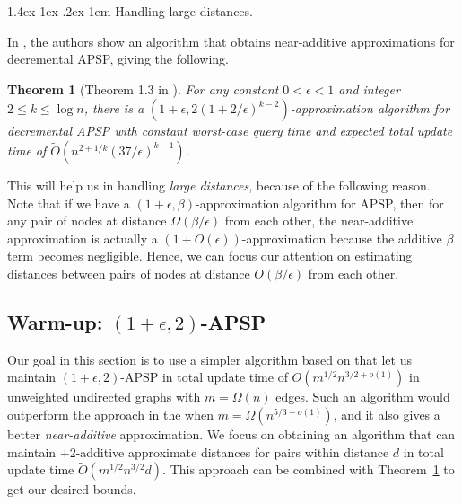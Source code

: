 \documentclass[11pt]{article}
\makeatletter
\newtheorem{theorem}{Theorem}[section]
\theoremstyle{definition}
\theoremstyle{remark}
\newcommand{\remove}[1]{}
\renewcommand{\paragraph}{%
  \@startsection{paragraph}{4}%
  {\z@}{1.4ex \@plus 1ex \@minus .2ex}{-1em}%
  {\normalfont\normalsize\bfseries}%
}
\makeatother
\begin{document}
\begin{titlepage}
\paragraph{Handling large distances.} 

In \cite{HKN14}, the authors show an algorithm that obtains near-additive approximations for decremental APSP, giving the following.

\begin{theorem}[Theorem 1.3 in \cite{HKN14}]\label{thm_large}
For any constant $0 < \epsilon < 1$ and integer $2 \leq k \leq \log{n}$, there is a $(1+\epsilon, 2(1+2/\epsilon)^{k-2})$-approximation algorithm for decremental APSP with constant worst-case query time and expected total update time of $\tilde{O}(n^{2+1/k} (37/\epsilon)^{k-1})$.
\end{theorem}

This will help us in handling \emph{large distances}, because of the following reason. Note that if we have a $(1+\epsilon,\beta)$-approximation algorithm for APSP, then for any pair of nodes at distance $\Omega(\beta/\epsilon)$ from each other, the near-additive approximation is actually a $(1+O(\epsilon))$-approximation because the additive $\beta$ term becomes negligible. Hence, we can focus our attention on estimating distances between pairs of nodes at distance $O(\beta/\epsilon)$ from each other.


\subsection{Warm-up: \texorpdfstring{$(1+\epsilon,2)$}{(1+epsilon,2)}-APSP }\label{sec:additive_warm_up}

Our goal in this section is to use a simpler algorithm based on \cite{DHZ00} that let us maintain $(1+\epsilon,2)$-APSP in total update time of $O(m^{1/2}n^{3/2+o(1)})$ in unweighted undirected graphs with $m=\Omega(n)$ edges. Such an algorithm would outperform the approach in the  when $m= \Omega( n^{5/3+o(1)} )$, and it also gives a better \emph{near-additive} approximation. We focus on obtaining an algorithm that can maintain $+2$-additive approximate distances for pairs within distance $d$ in total update time $\tilde{O}(m^{1/2}n^{3/2}d)$. This approach can be combined with Theorem~\ref{thm_large} to get our desired bounds. 

\remove{
The static version of the data structure is as follows:

}
\end{titlepage}
\end{document}
